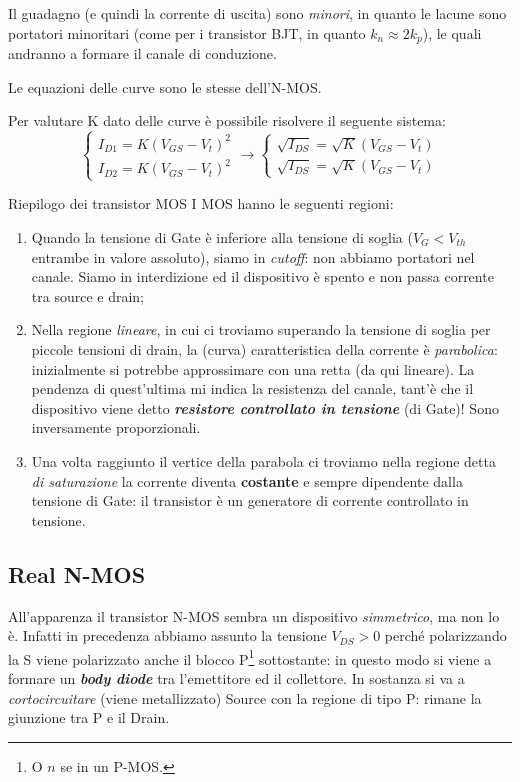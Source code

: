 \documentclass[
]{book}
\begin{document}
Il guadagno (e quindi la corrente di uscita) sono \emph{minori}, in
quanto le lacune sono portatori minoritari (come per i transistor BJT,
in quanto \(k_n\approx 2k_p\)), le quali andranno a formare il canale di
conduzione.

Le equazioni delle curve sono le stesse dell'N-MOS.

Per valutare K dato delle curve è possibile risolvere il seguente
sistema: \[
\begin{cases}
I_{D1}=K(V_{GS}-V_{t})^{2}\\
I_{D2}=K(V_{GS}-V_{t})^{2}\end{cases}\longrightarrow\begin{cases}\sqrt{I_{DS}}=\sqrt{K}(V_{GS}-V_{t})\\
\sqrt{I_{DS}}=\sqrt{K}(V_{GS}-V_{t})
\end{cases}
\]

\begin{bluebox}{Riepilogo dei transistor MOS}
I MOS hanno le seguenti regioni:
\begin{enumerate}
\item Quando la tensione di Gate è inferiore alla tensione di soglia ($V_{G}<V_{th}$ entrambe in valore assoluto), siamo in \emph{cutoff}: non abbiamo portatori nel canale. Siamo in interdizione ed il dispositivo è spento e non passa corrente tra source e drain;
\item Nella regione \emph{lineare}, in cui ci troviamo superando la tensione di soglia per piccole tensioni di drain, la (curva) caratteristica della corrente è \emph{parabolica}: inizialmente si potrebbe approssimare con una retta (da qui lineare). La pendenza di quest'ultima mi indica la resistenza del canale, tant'è che il dispositivo viene detto \emph{\textbf{resistore controllato in tensione}} (di Gate)! Sono inversamente proporzionali.
\item Una volta raggiunto il vertice della parabola ci troviamo nella regione detta \emph{di saturazione} la corrente diventa \textbf{costante} e sempre dipendente dalla tensione di Gate: il transistor è un generatore di corrente controllato in tensione.
\end{enumerate}
\end{bluebox}

\subsection{Real N-MOS}\label{real-n-mos}

All'apparenza il transistor N-MOS sembra un dispositivo
\emph{simmetrico}, ma non lo è. Infatti in precedenza abbiamo assunto la
tensione \(V_{DS}>0\) perché polarizzando la S viene polarizzato anche
il blocco P\footnote{O \(n\) se in un P-MOS.} sottostante: in questo
modo si viene a formare un \textbf{\emph{body diode}} tra l'emettitore
ed il collettore. In sostanza si va a \emph{cortocircuitare} (viene
metallizzato) Source con la regione di tipo P: rimane la giunzione tra P
e il Drain.
\end{document}
